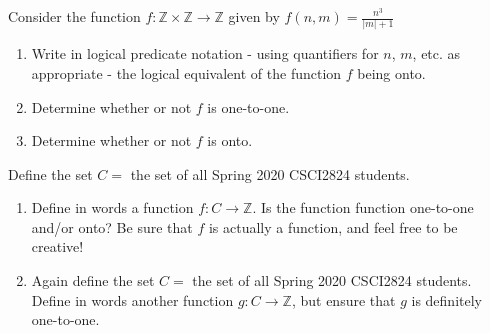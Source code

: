 \documentclass[11pt]{amsart}
\newcommand{\be}{\begin{enumerate}}
\newcommand{\ee}{\end{enumerate}}
\begin{document}
	\begin{sol}
	\end{sol}

\item Consider the function $f: \mathbb{Z} \times \mathbb{Z} \rightarrow \mathbb{Z}$ given by $f(n,m)=\frac{n^3}{|m|+1}$
	\be
	\item Write in logical predicate notation - using quantifiers for $n$, $m$, etc. as appropriate - the logical equivalent of the function $f$ being onto.
	\item Determine whether or not $f$ is one-to-one.
	\item Determine whether or not $f$ is onto.
	\ee
	\begin{sol}
	\end{sol}

\item Define the set $C=$ the set of all Spring 2020 CSCI2824 students.
\be
\item Define in words a function $f: C \rightarrow \mathbb{Z}$.  Is the function function one-to-one and/or onto? Be sure that $f$ is actually a function, and feel free to be creative!
\item Again define the set $C=$ the set of all Spring 2020 CSCI2824 students.  Define in words another function $g: C \rightarrow \mathbb{Z}$, but ensure that $g$ is definitely one-to-one. 
\ee

\begin{sol}
\end{sol}
\end{document}
